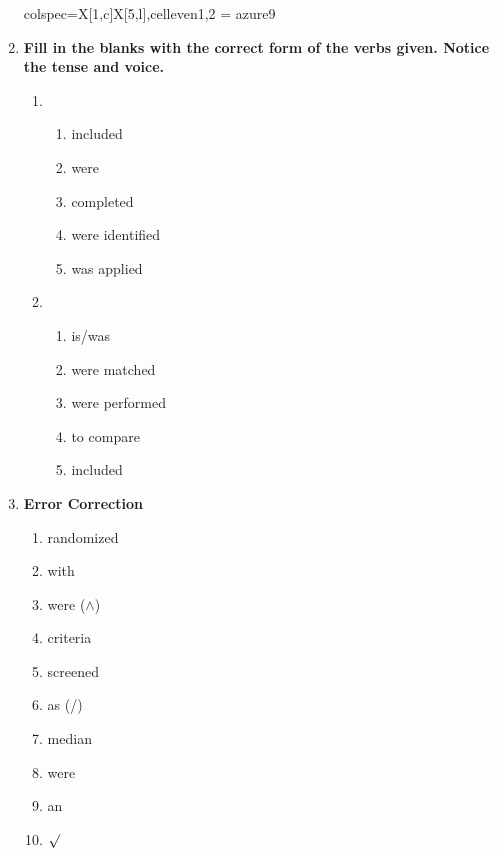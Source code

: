 \documentclass[a4paper]{ctexbook}
\begin{document}
\begin{enumerate}
{\begin{tblr}{colspec={X[1,c]X[5,l]},cell{even}{1,2} = {azure9}}
    \bottomrule
  \end{tblr}
  }

  \item \textbf{Fill in the blanks with the correct form of the verbs given. Notice the tense and voice.}
  \begin{enumerate}
    \item ~
    \begin{enumerate}
      \item included
      \item were
      \item completed
      \item were identified
      \item was applied
    \end{enumerate}
    
    \item ~
    \begin{enumerate}
      \item is/was
      \item were matched
      \item were performed
      \item to compare
      \item included
    \end{enumerate}
  \end{enumerate}

  \item \textbf{Error Correction}
  \begin{enumerate}
    \item randomized
    \item with
    \item were ($\wedge$)
    \item criteria
    \item screened
    \item as (/)
    \item median
    \item were
    \item an
    \item $\surd$
  \end{enumerate}
\end{enumerate}
\end{document}
